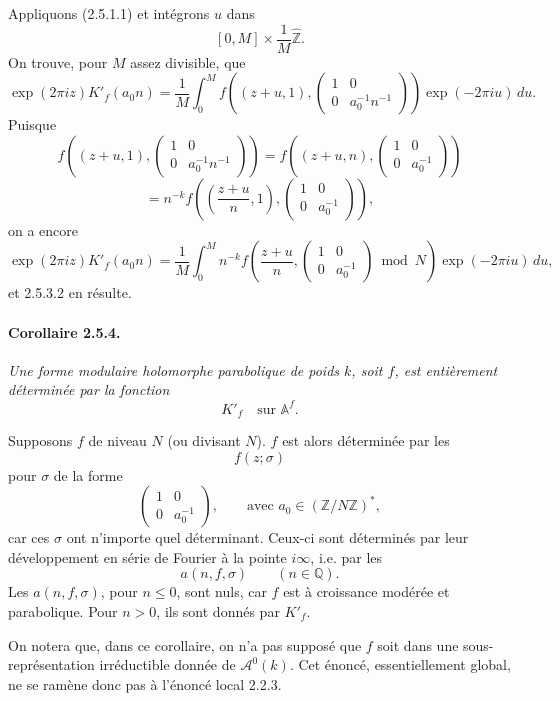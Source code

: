 \documentclass[10pt,a4paper]{article}
\providecommand{\Q}{\mathbb Q}
\providecommand{\Z}{\mathbb Z}
\providecommand{\Af}{\mathbb A^f}
\begin{document}
Appliquons (2.5.1.1) et intégrons \(u\) dans
\[
[0,M]\times \frac1M\widehat{\Z}.
\]
On trouve, pour \(M\) assez divisible, que
\[
\exp(2\pi iz)K'_f(a_0n)
=
\frac1M\int_0^M
f\!\left((z+u,1),
\begin{pmatrix}1&0\\0&a_0^{-1}n^{-1}\end{pmatrix}\right)
\exp(-2\pi iu)\,du.
\]
Puisque
\[
f\!\left((z+u,1),
\begin{pmatrix}1&0\\0&a_0^{-1}n^{-1}\end{pmatrix}\right)
=
f\!\left((z+u,n),
\begin{pmatrix}1&0\\0&a_0^{-1}\end{pmatrix}\right)
\]
\[
=
n^{-k}
f\!\left(\left(\frac{z+u}{n},1\right),
\begin{pmatrix}1&0\\0&a_0^{-1}\end{pmatrix}\right),
\]
on a encore
\[
\exp(2\pi iz)K'_f(a_0n)
=
\frac1M\int_0^M
n^{-k}f\!\left(\frac{z+u}{n},
\begin{pmatrix}1&0\\0&a_0^{-1}\end{pmatrix}\bmod N\right)
\exp(-2\pi iu)\,du,
\]
et 2.5.3.2 en résulte.

\paragraph{Corollaire 2.5.4.}{\itshape  Une forme modulaire holomorphe parabolique de poids \(k\), soit \(f\), est entièrement déterminée par la fonction
\[
K'_f\quad\text{sur }\Af.
\]\par}

Supposons \(f\) de niveau \(N\) (ou divisant \(N\)). \(f\) est alors déterminée par les
\[
f(z;\sigma)
\]
pour \(\sigma\) de la forme
\[
\begin{pmatrix}1&0\\0&a_0^{-1}\end{pmatrix},
\qquad\text{avec }
a_0\in(\Z/N\Z)^*,
\]
car ces \(\sigma\) ont n'importe quel déterminant. Ceux-ci sont déterminés par leur développement en série de Fourier à la pointe \(i\infty\), i.e. par les
\[
a(n,f,\sigma)\qquad(n\in\Q).
\]
Les \(a(n,f,\sigma)\), pour \(n\le0\), sont nuls, car \(f\) est à croissance modérée et parabolique. Pour \(n>0\), ils sont donnés par \(K'_f\).

On notera que, dans ce corollaire, on n'a pas supposé que \(f\) soit dans une sous-représentation irréductible donnée de \(\mathcal A^0(k)\). Cet énoncé, essentiellement global, ne se ramène donc pas à l'énoncé local 2.2.3.
\end{document}
